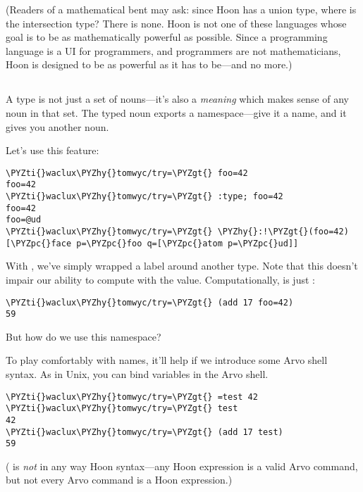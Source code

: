 (Readers of a mathematical bent may ask: since Hoon has a union
type, where is the intersection type?  There is none.  Hoon is
not one of these languages whose goal is to be as mathematically
powerful as possible.  Since a programming language is a UI for
programmers, and programmers are not mathematicians, Hoon is
designed to be as powerful as it has to be---and no more.)

\subsection{}

A type is not just a set of nouns---it's also a \emph{meaning} which
makes sense of any noun in that set.  The typed noun exports a
namespace---give it a name, and it gives you another noun.

Let's use this feature:

\begin{framed_shaded}
\begin{Verbatim}[fontsize=\relsize{-2.5},fontseries=b,commandchars=\\\{\}]
\PYZti{}waclux\PYZhy{}tomwyc/try=\PYZgt{} foo=42
foo=42
\PYZti{}waclux\PYZhy{}tomwyc/try=\PYZgt{} :type; foo=42
foo=42
foo=@ud
\PYZti{}waclux\PYZhy{}tomwyc/try=\PYZgt{} \PYZhy{}:!\PYZgt{}(foo=42)
[\PYZpc{}face p=\PYZpc{}foo q=[\PYZpc{}atom p=\PYZpc{}ud]]
\end{Verbatim}
\end{framed_shaded}
With , we've simply wrapped a label around another type.
Note that this doesn't impair our ability to compute with the
value.  Computationally,  is just : 

\begin{framed_shaded}
\begin{Verbatim}[fontsize=\relsize{-2.5},fontseries=b,commandchars=\\\{\}]
\PYZti{}waclux\PYZhy{}tomwyc/try=\PYZgt{} (add 17 foo=42)
59
\end{Verbatim}
\end{framed_shaded}
But how do we use this namespace?

To play comfortably with names, it'll help if we introduce some Arvo
shell syntax.  As in Unix, you can bind variables in the Arvo shell.

\begin{framed_shaded}
\begin{Verbatim}[fontsize=\relsize{-2.5},fontseries=b,commandchars=\\\{\}]
\PYZti{}waclux\PYZhy{}tomwyc/try=\PYZgt{} =test 42
\PYZti{}waclux\PYZhy{}tomwyc/try=\PYZgt{} test
42
\PYZti{}waclux\PYZhy{}tomwyc/try=\PYZgt{} (add 17 test)
59
\end{Verbatim}
\end{framed_shaded}
( is \emph{not} in any way Hoon syntax---any Hoon expression
is a valid Arvo command, but not every Arvo command is a Hoon
expression.)

